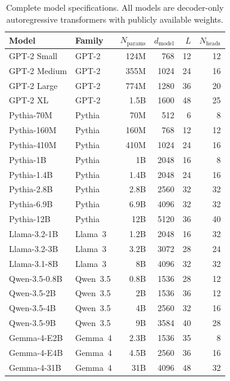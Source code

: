\documentclass{article}
\begin{document}
\begin{table}[h]
\centering
\caption{Complete model specifications. All models are decoder-only autoregressive transformers with publicly available weights.}
\label{tab:model-details}
\small
\begin{tabular}{@{}llrrrr@{}}
\toprule
\textbf{Model} & \textbf{Family} & $N_{\text{params}}$ & $d_{\text{model}}$ & $L$ & $N_{\text{heads}}$ \\
\midrule
GPT-2 Small & GPT-2 & 124M & 768 & 12 & 12 \\
GPT-2 Medium & GPT-2 & 355M & 1024 & 24 & 16 \\
GPT-2 Large & GPT-2 & 774M & 1280 & 36 & 20 \\
GPT-2 XL & GPT-2 & 1.5B & 1600 & 48 & 25 \\
\midrule
Pythia-70M & Pythia & 70M & 512 & 6 & 8 \\
Pythia-160M & Pythia & 160M & 768 & 12 & 12 \\
Pythia-410M & Pythia & 410M & 1024 & 24 & 16 \\
Pythia-1B & Pythia & 1B & 2048 & 16 & 8 \\
Pythia-1.4B & Pythia & 1.4B & 2048 & 24 & 16 \\
Pythia-2.8B & Pythia & 2.8B & 2560 & 32 & 32 \\
Pythia-6.9B & Pythia & 6.9B & 4096 & 32 & 32 \\
Pythia-12B & Pythia & 12B & 5120 & 36 & 40 \\
\midrule
Llama-3.2-1B & Llama~3 & 1.2B & 2048 & 16 & 32 \\
Llama-3.2-3B & Llama~3 & 3.2B & 3072 & 28 & 24 \\
Llama-3.1-8B & Llama~3 & 8B & 4096 & 32 & 32 \\
\midrule
Qwen-3.5-0.8B & Qwen~3.5 & 0.8B & 1536 & 28 & 12 \\
Qwen-3.5-2B & Qwen~3.5 & 2B & 1536 & 36 & 12 \\
Qwen-3.5-4B & Qwen~3.5 & 4B & 2560 & 32 & 16 \\
Qwen-3.5-9B & Qwen~3.5 & 9B & 3584 & 40 & 28 \\
\midrule
Gemma-4-E2B & Gemma~4 & 2.3B & 1536 & 35 & 8 \\
Gemma-4-E4B & Gemma~4 & 4.5B & 2560 & 36 & 16 \\
Gemma-4-31B & Gemma~4 & 31B & 4096 & 48 & 32 \\
\bottomrule
\end{tabular}
\end{table}

\end{document}
